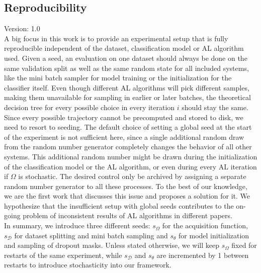 \documentclass[]{article}
\begin{document}
\subsection{Reproducibility}\label{sec:reproducibility}
{\color{red} Version: 1.0}\\
A big focus in this work is to provide an experimental setup that is fully reproducible independent of the dataset, classification model or AL algorithm used.
Given a seed, an evaluation on one dataset should always be done on the same validation split as well as the same random state for all included systems, like the mini batch sampler for model training or the initialization for the classifier itself.
Even though different AL algorithms will pick different samples, making them unavailable for sampling in earlier or later batches, the theoretical decision tree for every possible choice in every iteration $i$ should stay the same.
Since every possible trajectory cannot be precomputed and stored to disk, we need to resort to seeding.
The default choice of setting a global seed at the start of the experiment is not sufficient here, since a single additional random draw from the random number generator completely changes the behavior of all other systems.
This additional random number might be drawn during the initialization of the classification model or the AL algorithm, or even during every AL iteration if $\Omega$ is stochastic.
The desired control only be archived by assigning a separate random number generator to all these processes.
To the best of our knowledge, we are the first work that discusses this issue and proposes a solution for it.
We hypothesize that the insufficient setup with global seeds contributes to the on-going problem of inconsistent results of AL algorithms in different papers. \\ [1mm]
In summary, we introduce three different seeds: $s_\Omega$ for the acquisition function, $s_\mathcal{D}$ for dataset splitting and mini batch sampling and $s_\theta$ for model initialization and sampling of dropout masks.
Unless stated otherwise, we will keep $s_\Omega$ fixed for restarts of the same experiment, while $s_\mathcal{D}$ and $s_\theta$ are incremented by 1 between restarts to introduce stochasticity into our framework.

\end{document}

